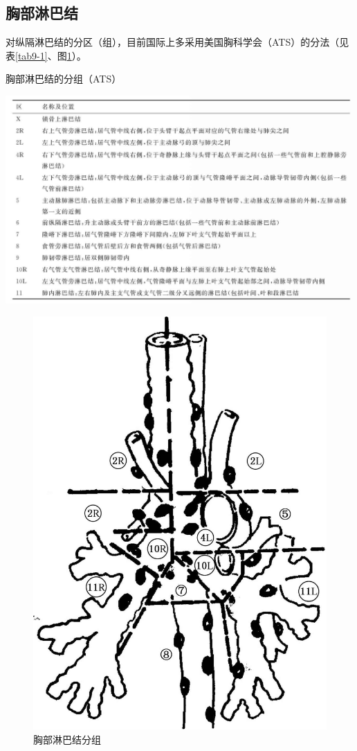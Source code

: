 \subsection{胸部淋巴结}

对纵隔淋巴结的分区（组），目前国际上多采用美国胸科学会（ATS）的分法（见表\ref{tab9-1}、图\ref{fig9-1}）。

\begin{table}[htbp]
\centering
\caption{胸部淋巴结的分组（ATS）}
\label{tab9-1}
\includegraphics[width=\textwidth,height=\textheight,keepaspectratio]{./images/Image00181.jpg}
\end{table}

\begin{figure}[!htbp]
 \centering
 \includegraphics[width=.7\textwidth,height=\textheight,keepaspectratio]{./images/Image00182.jpg}
 \captionsetup{justification=centering}
 \caption{胸部淋巴结分组}
 \label{fig9-1}
  \end{figure} 

